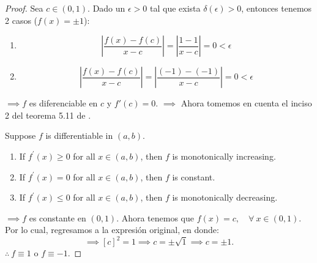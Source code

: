 \begin{proof}
Sea $c\in (0,1)$. Dado un $\epsilon>0$ tal que exista $\delta(\epsilon)>0$, entonces tenemos 2 casos ($f(x)=\pm 1$): 
\begin{enumerate}
    \item $$\left|\frac{f(x)-f(c)}{x-c}\right|=\left|\frac{1-1}{x-c}\right|=0<\epsilon$$
    \item  $$\left|\frac{f(x)-f(c)}{x-c}\right|=\left|\frac{(-1)-(-1)}{x-c}\right|=0<\epsilon$$
\end{enumerate}
$\implies f$ es diferenciable en $c$ y $f'(c)=0$.  
$\implies$ Ahora tomemos en cuenta el inciso 2 del teorema 5.11 de \cite{rudin1976principles}.
\begin{tcolorbox}[colback=gray!15,colframe=gray!1!gray,title=Teorema 5.11 de \cite{rudin1976principles}]
Suppose $f$ is differentiable in $(a, b)$.
\begin{enumerate}
    \item If $f^{\prime}(x) \geq 0$ for all $x \in(a, b)$, then $f$ is monotonically increasing.
    \item If $f^{\prime}(x)=0$ for all $x \in(a, b)$, then $f$ is constant.
    \item If $f^{\prime}(x) \leq 0$ for all $x \in(a, b)$, then $f$ is monotonically decreasing.
\end{enumerate}
\end{tcolorbox}
$\implies f$ es constante en $(0,1)$. Ahora tenemos que $f(x)=c, \quad \forall \ x\in(0,1)$. Por lo cual, regresamos a la expresión original, en donde:
$$\implies [c]^2=1 \implies c=\pm\sqrt{1}\implies c=\pm 1.$$
$\therefore \ f\equiv 1$ o $f\equiv-1$. 
\end{proof}